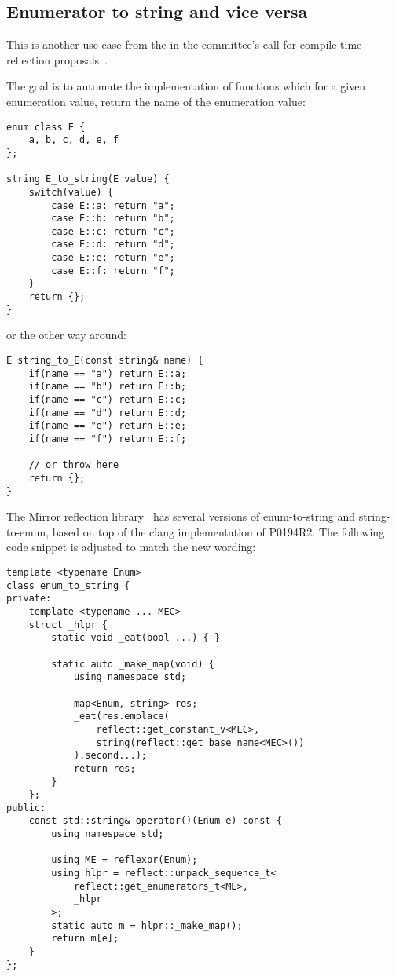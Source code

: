 \subsection{Enumerator to string and vice versa}
\label{use-case-enum-to-string}

This is another use case from the  in the committee's
call for compile-time reflection proposals~\cite{ISOCPP-N3814}. 

The goal is to automate the implementation of functions which for a given
enumeration value, return the name of the enumeration value:

\begin{verbatim}
enum class E {
	a, b, c, d, e, f
};

string E_to_string(E value) {
	switch(value) {
		case E::a: return "a";
		case E::b: return "b";
		case E::c: return "c";
		case E::d: return "d";
		case E::e: return "e";
		case E::f: return "f";
	}
	return {};
}
\end{verbatim}

or the other way around:

\begin{verbatim}
E string_to_E(const string& name) {
	if(name == "a") return E::a;
	if(name == "b") return E::b;
	if(name == "c") return E::c;
	if(name == "d") return E::d;
	if(name == "e") return E::e;
	if(name == "f") return E::f;

	// or throw here
	return {};
}
\end{verbatim}

The Mirror reflection library~\cite{Chochlik-Mirror-new-doc} has several
versions of enum-to-string and string-to-enum, based on top of the clang
implementation of P0194R2. The following code snippet is adjusted to
match the new wording:

\begin{verbatim}
template <typename Enum>
class enum_to_string {
private:
	template <typename ... MEC>
	struct _hlpr {
		static void _eat(bool ...) { }

		static auto _make_map(void) {
			using namespace std;

			map<Enum, string> res;
			_eat(res.emplace(
				reflect::get_constant_v<MEC>,
				string(reflect::get_base_name<MEC>())
			).second...);
			return res;
		}
	};
public:
	const std::string& operator()(Enum e) const {
		using namespace std;

		using ME = reflexpr(Enum);
		using hlpr = reflect::unpack_sequence_t<
			reflect::get_enumerators_t<ME>,
			_hlpr
		>;
		static auto m = hlpr::_make_map();
		return m[e];
	}
};
\end{verbatim}


